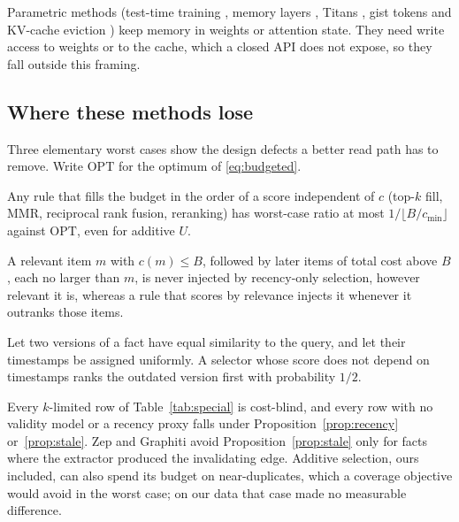 Parametric methods (test-time training \cite{sun2020ttt,sun2024ttt}, memory layers \cite{berges2024memorylayers}, Titans \cite{behrouz2024titans}, gist tokens and KV-cache eviction \cite{petrov2025gist,zhang2023h2o,li2024snapkv}) keep memory in weights or attention state. They need write access to weights or to the cache, which a closed API does not expose, so they fall outside this framing.

\subsection{Where these methods lose}
Three elementary worst cases show the design defects a better read path has to remove. Write $\mathrm{OPT}$ for the optimum of \eqref{eq:budgeted}.

\begin{proposition}\label{prop:cost}
Any rule that fills the budget in the order of a score independent of $c$ (top-$k$ fill, MMR, reciprocal rank fusion, reranking) has worst-case ratio at most $1/\lfloor B/c_{\min}\rfloor$ against $\mathrm{OPT}$, even for additive $U$.
\end{proposition}

\begin{proposition}\label{prop:recency}
A relevant item $m$ with $c(m)\le B$, followed by later items of total cost above $B$, each no larger than $m$, is never injected by recency-only selection, however relevant it is, whereas a rule that scores by relevance injects it whenever it outranks those items.
\end{proposition}

\begin{proposition}\label{prop:stale}
Let two versions of a fact have equal similarity to the query, and let their timestamps be assigned uniformly. A selector whose score does not depend on timestamps ranks the outdated version first with probability $1/2$.
\end{proposition}

Every $k$-limited row of Table~\ref{tab:special} is cost-blind, and every row with no validity model or a recency proxy falls under Proposition~\ref{prop:recency} or~\ref{prop:stale}. Zep and Graphiti avoid Proposition~\ref{prop:stale} only for facts where the extractor produced the invalidating edge. Additive selection, ours included, can also spend its budget on near-duplicates, which a coverage objective would avoid in the worst case; on our data that case made no measurable difference.
